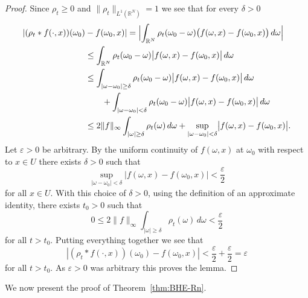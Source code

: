 \documentclass[a4paper, reqno,titlepage]{amsart}
\numberwithin{equation}{section}
\theoremstyle{plain}
\theoremstyle{definition}
\theoremstyle{remark}
\newcommand{\RR}{\mathbb{R}}
\begin{document}
\begin{proof}
  Since $\rho_t\geq 0$ and $\|\rho_t\|_{L^1(\RR^N)}=1$ we see that for every $\delta>0$
  \begin{equation*}
    \begin{split}
      |(\rho_t * f(\cdot,x))(\omega_0)&-f(\omega_0,x)|
      =\Bigl|\int_{\RR^N}\rho_t(\omega_0-\omega)\bigl(f(\omega,x)-f(\omega_0,x)\bigr)\,d\omega\Bigr|\\
      &\leq\int_{\RR^N}\rho_t(\omega_0-\omega)\bigl|f(\omega,x)-f(\omega_0,x)\bigr|\,d\omega\\
      &\leq\int_{|\omega-\omega_0|\geq\delta}\rho_t(\omega_0-\omega)\bigl|f(\omega,x)-f(\omega_0,x)\bigr|\,d\omega\\
      &\qquad+\int_{|\omega-\omega_0|<\delta}\rho_t(\omega_0-\omega)\bigl|f(\omega,x)-f(\omega_0,x)\bigr|\,d\omega\\
      &\leq 2\|f\|_{\infty}\int_{|\omega|\geq\delta}\rho_t(\omega)\,d\omega
      +\sup_{|\omega-\omega_0|<\delta}\bigl|f(\omega,x)-f(\omega_0,x)\bigr|.
    \end{split}
  \end{equation*}
  Let $\varepsilon>0$ be arbitrary. By the uniform continuity of $f(\omega,x)$ at $\omega_0$ with respect to $x\in U$ there exists $\delta>0$ such that
  \begin{equation*}
    \sup_{|\omega-\omega_0|<\delta}\bigl|f(\omega,x)-f(\omega_0,x)\bigr|<\frac{\varepsilon}{2}
  \end{equation*}
  for all $x\in U$. With this choice of $\delta>0$, using the definition of an approximate identity, there exists $t_0>0$ such that
  \begin{equation*}
    0\leq  2\|f\|_\infty\int_{|\omega|\geq\delta}\rho_t(\omega)\,d\omega<\frac{\varepsilon}{2}
  \end{equation*}
  for all $t>t_0$.  Putting everything together we see that
  \begin{equation*}
    |(\rho_t * f(\cdot,x))(\omega_0)-f(\omega_0,x)|
    <\frac{\varepsilon}{2}+\frac{\varepsilon}{2}
    =\varepsilon
  \end{equation*}
  for all $t>t_0$. As $\varepsilon>0$ was arbitrary this proves the lemma.
\end{proof}

We now present the proof of Theorem~\ref{thm:BHE-Rn}.
\end{document}
